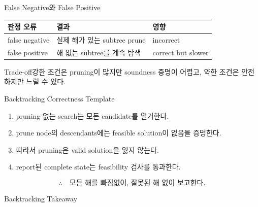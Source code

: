 \begin{frame}{False Negative와 False Positive}
\small\begin{tabular}{lll}\toprule
판정 오류&결과&영향\\\midrule
false negative&실제 해가 있는 subtree prune&incorrect\\
false positive&해 없는 subtree를 계속 탐색&correct but slower\\\bottomrule
\end{tabular}
\begin{block}{Trade-off}강한 조건은 pruning이 많지만 soundness 증명이 어렵고, 약한 조건은 안전하지만 느릴 수 있다.\end{block}
\end{frame}
\begin{frame}{Backtracking Correctness Template}
\begin{enumerate}
\item pruning 없는 search는 모든 candidate를 열거한다.
\item prune node의 descendants에는 feasible solution이 없음을 증명한다.
\item 따라서 pruning은 valid solution을 잃지 않는다.
\item report된 complete state는 feasibility 검사를 통과한다.
\end{enumerate}
\[
\therefore\quad\text{모든 해를 빠짐없이, 잘못된 해 없이 보고한다.}
\]
\end{frame}
\begin{frame}{Backtracking Takeaway}
\end{frame}
